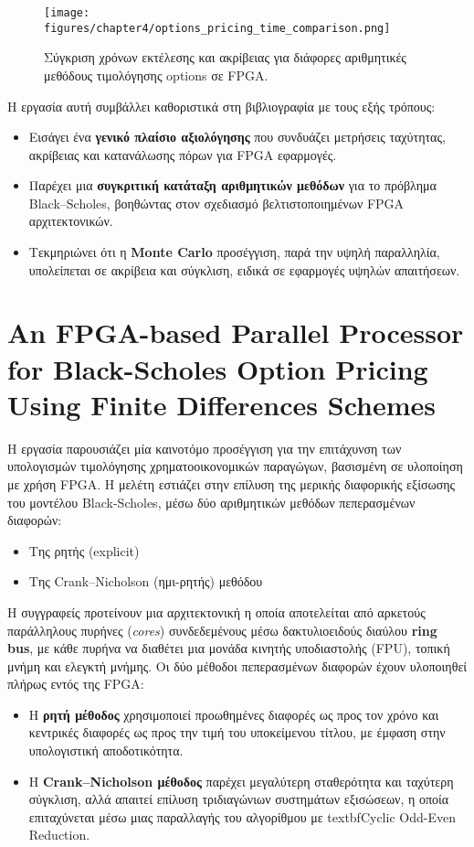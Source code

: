 \begin{figure}[h!]
  \centering
  \texttt{[image: figures/chapter4/options\_pricing\_time\_comparison.png]}
  \caption{Σύγκριση χρόνων εκτέλεσης και ακρίβειας για διάφορες αριθμητικές μεθόδους τιμολόγησης options σε FPGA.}
  \label{fig:options_pricing_time_comparison}
\end{figure}

Η εργασία αυτή συμβάλλει καθοριστικά στη βιβλιογραφία με τους εξής τρόπους:
\begin{itemize}
  \item Εισάγει ένα \textbf{γενικό πλαίσιο αξιολόγησης} που συνδυάζει μετρήσεις ταχύτητας, ακρίβειας και κατανάλωσης πόρων για FPGA εφαρμογές.
  \item Παρέχει μια \textbf{συγκριτική κατάταξη αριθμητικών μεθόδων} για το πρόβλημα Black–Scholes, βοηθώντας στον σχεδιασμό βελτιστοποιημένων FPGA αρχιτεκτονικών.
  \item Τεκμηριώνει ότι η \textbf{Monte Carlo} προσέγγιση, παρά την υψηλή παραλληλία, υπολείπεται σε ακρίβεια και σύγκλιση, ειδικά σε εφαρμογές υψηλών απαιτήσεων.
\end{itemize}

\section{An FPGA-based Parallel Processor for Black-Scholes Option Pricing Using Finite Differences Schemes}

Η εργασία \cite{fpga_parallel_processor_black_scholes_papaeustathiou} παρουσιάζει μία καινοτόμο προσέγγιση
για την επιτάχυνση των υπολογισμών τιμολόγησης χρηματοοικονομικών παραγώγων, βασισμένη σε υλοποίηση με χρήση FPGA.
Η μελέτη εστιάζει στην επίλυση της μερικής διαφορικής εξίσωσης του μοντέλου Black-Scholes, μέσω δύο αριθμητικών μεθόδων πεπερασμένων διαφορών:
\begin{itemize}
    \item Της ρητής (explicit)
    \item Της Crank–Nicholson (ημι-ρητής) μεθόδου
\end{itemize}

Η συγγραφείς προτείνουν μια αρχιτεκτονική η οποία αποτελείται από αρκετούς παράλληλους πυρήνες (\textit{cores}) συνδεδεμένους
μέσω δακτυλιοειδούς διαύλου \textbf{ring bus}, με κάθε πυρήνα να διαθέτει μια μονάδα κινητής υποδιαστολής (FPU), τοπική μνήμη
και ελεγκτή μνήμης. 
Οι δύο μέθοδοι πεπερασμένων διαφορών έχουν υλοποιηθεί πλήρως εντός της FPGA:
\begin{itemize}
  \item Η \textbf{ρητή μέθοδος} χρησιμοποιεί προωθημένες διαφορές ως προς τον χρόνο και κεντρικές διαφορές ως προς την τιμή του υποκείμενου τίτλου, με έμφαση στην υπολογιστική αποδοτικότητα.
  \item Η \textbf{Crank–Nicholson μέθοδος} παρέχει μεγαλύτερη σταθερότητα και ταχύτερη σύγκλιση, αλλά απαιτεί επίλυση τριδιαγώνιων συστημάτων εξισώσεων, η οποία επιταχύνεται
  μέσω μιας παραλλαγής του αλγορίθμου με textbf{Cyclic Odd-Even Reduction}.
\end{itemize}

